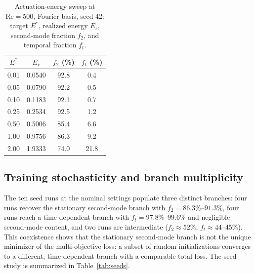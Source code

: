 \documentclass[aip,pof,reprint,superscriptaddress]{revtex4-2}
\newcommand{\re}{\mathrm{Re}}
\begin{document}
\begin{table}[t]
\caption{\label{tab:energy} Actuation-energy sweep at $\re=500$, Fourier basis, seed 42: target $E^*$, realized energy $E_r$, second-mode fraction $f_2$, and temporal fraction $f_t$.}
\centering
\begin{tabular}{cccc}
\toprule
$E^*$ & $E_r$ & $f_2$ (\%) & $f_t$ (\%) \\
\midrule
0.01 & 0.0540 & 92.8 & 0.4 \\
0.05 & 0.0790 & 92.2 & 0.5 \\
0.10 & 0.1183 & 92.1 & 0.7 \\
0.25 & 0.2534 & 92.5 & 1.2 \\
0.50 & 0.5006 & 85.4 & 6.6 \\
1.00 & 0.9756 & 86.3 & 9.2 \\
2.00 & 1.9333 & 74.0 & 21.8 \\
\bottomrule
\end{tabular}
\end{table}

\subsection{Training stochasticity and branch multiplicity}\label{sec:seeds}

The ten seed runs at the nominal settings populate three distinct branches: four runs recover the stationary second-mode branch with $f_2=86.3\%$--$91.3\%$, four runs reach a time-dependent branch with $f_t=97.8\%$--$99.6\%$ and negligible second-mode content, and two runs are intermediate ($f_2\approx52\%$, $f_t\approx44$--45\%). This coexistence shows that the stationary second-mode branch is not the unique minimizer of the multi-objective loss: a subset of random initializations converges to a different, time-dependent branch with a comparable total loss. The seed study is summarized in Table~\ref{tab:seeds}.
\end{document}
